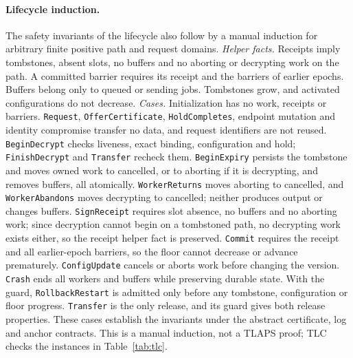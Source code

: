 \documentclass[pdflatex,sn-mathphys-num]{sn-jnl}
\newcommand{\code}[1]{\texttt{#1}}
\begin{document}
\paragraph{Lifecycle induction.}
The safety invariants of the lifecycle also follow by a manual induction for arbitrary finite positive path and request domains.
\emph{Helper facts.} Receipts imply tombstones, absent slots, no buffers and no aborting or decrypting work on the path. A committed barrier requires its receipt and the barriers of earlier epochs. Buffers belong only to queued or sending jobs. Tombstones grow, and activated configurations do not decrease.
\emph{Cases.} Initialization has no work, receipts or barriers. \code{Request}, \code{OfferCertificate}, \code{HoldCompletes}, endpoint mutation and identity compromise transfer no data, and request identifiers are not reused. \code{BeginDecrypt} checks liveness, exact binding, configuration and hold; \code{FinishDecrypt} and \code{Transfer} recheck them. \code{BeginExpiry} persists the tombstone and moves owned work to cancelled, or to aborting if it is decrypting, and removes buffers, all atomically. \code{WorkerReturns} moves aborting to cancelled, and \code{WorkerAbandons} moves decrypting to cancelled; neither produces output or changes buffers. \code{SignReceipt} requires slot absence, no buffers and no aborting work; since decryption cannot begin on a tombstoned path, no decrypting work exists either, so the receipt helper fact is preserved. \code{Commit} requires the receipt and all earlier-epoch barriers, so the floor cannot decrease or advance prematurely. \code{ConfigUpdate} cancels or aborts work before changing the version. \code{Crash} ends all workers and buffers while preserving durable state. With the guard, \code{RollbackRestart} is admitted only before any tombstone, configuration or floor progress. \code{Transfer} is the only release, and its guard gives both release properties.
These cases establish the invariants under the abstract certificate, log and anchor contracts. This is a manual induction, not a TLAPS proof; TLC checks the instances in Table~\ref{tab:tlc}.
\end{document}
